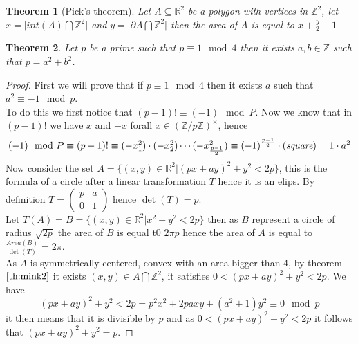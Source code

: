 \documentclass[a4paper,11pt,american]{article}
\newcommand{\R}{\mathbb{R}}
\newcommand{\Z}{\mathbb{Z}}
\theoremstyle{plain}
\newtheorem{theorem}{Theorem}
\theoremstyle{definition}
\begin{document}
\begin{theorem}[Pick's theorem]
    Let $A\subseteq \R^2$ be a polygon with vertices in $\Z^2$, let $x=\vert int(A)\bigcap \Z^2\vert$ and $y=\vert \partial A\bigcap \Z^2\vert$ then the area of $A$ is equal to $x+\frac{y}{2}-1$
\end{theorem}

\begin{theorem}
    Let $p$ be a prime such that $p\equiv 1\mod 4$ then it exists $a,b\in\Z$ such that $p=a^2+b^2$.
\end{theorem}
\begin{proof}
    First we will prove that if $p\equiv 1\mod 4$ then it exists $a$ such that $a^2\equiv -1 \mod p$.\\
    To do this we first notice that $(p-1)!\equiv (-1)\mod P$. Now 
    we know that in $(p-1)!$ we have $x$ and $-x$ forall $x\in (\Z/p\Z)^{\times}$, hence $$(-1)\mod P\equiv(p-1)!\equiv (-x_1^2)\cdot(-x_2^2)\cdots(-x^2_{\frac{p-1}{2}})\equiv (-1)^{\frac{p-1}{2}}\cdot(\emph{square})=1\cdot a^2$$
    Now consider the set $A=\{(x,y)\in\R^2\vert(px+ay)^2+y^2<2p\}$, this is the formula of a circle after a linear transformation $T$ hence it is an elips. By definition $T=\begin{pmatrix}
        p & a  \\
        0 & 1  
      \end{pmatrix} $ hence $\det(T)=p$.\\
      Let $T(A)=B=\{(x,y)\in\R^2\vert x^2+y^2<2p\}$ then as $B$ represent a circle of radius $\sqrt{2p}$ the area of $B$ is equal t0 $2\pi p$ hence the area of $A$ is equal to $\frac{Area(B)}{\det(T)}=2\pi$.\\
      As $A$ is symmetrically centered, convex with an area bigger than 4, by theorem $\eqref{th:mink2}$ it exists $(x,y)\in A\bigcap\Z^2$, it satisfies $0<(px+ay)^2+y^2<2p$.
      We have $$(px+ay)^2+y^2<2p=p^2x^2+2paxy+(a^2+1)y^2\equiv0\mod p$$ it then means that it is divisible by $p$ and as $0<(px+ay)^2+y^2<2p$ it follows that $(px+ay)^2+y^2=p$.
\end{proof}
\end{document}
